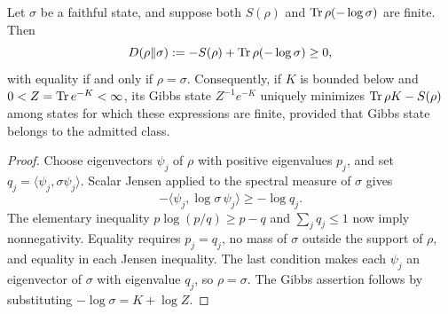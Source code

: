 \begin{lemma}\label{lem:gibbs-variational}
Let \(\sigma\) be a faithful state, and suppose both \(S(\rho)\) and \(\operatorname{Tr}\rho(-\log\sigma)\) are finite. Then
\[
 D(\rho\Vert\sigma):=-S(\rho)+\operatorname{Tr}\rho(-\log\sigma)\ge0,
\]
with equality if and only if \(\rho=\sigma\).
Consequently, if \(K\) is bounded below and \(0<Z=\operatorname{Tr} e^{-K}<\infty\), its Gibbs state \(Z^{-1}e^{-K}\) uniquely minimizes \(\operatorname{Tr}\rho K-S(\rho)\) among states for which these expressions are finite, provided that Gibbs state belongs to the admitted class.
\end{lemma}
\begin{proof}
Choose eigenvectors \(\psi_j\) of \(\rho\) with positive eigenvalues \(p_j\), and set \(q_j=\langle\psi_j,\sigma\psi_j\rangle\). Scalar Jensen applied to the spectral measure of \(\sigma\) gives
\[
 -\langle\psi_j,\log\sigma\,\psi_j\rangle\ge-\log q_j.
\]
The elementary inequality \(p\log(p/q)\ge p-q\) and \(\sum_jq_j\le1\) now imply nonnegativity. Equality requires \(p_j=q_j\), no mass of \(\sigma\) outside the support of \(\rho\), and equality in each Jensen inequality. The last condition makes each \(\psi_j\) an eigenvector of \(\sigma\) with eigenvalue \(q_j\), so \(\rho=\sigma\). The Gibbs assertion follows by substituting \(-\log\sigma=K+\log Z\).
\end{proof}

